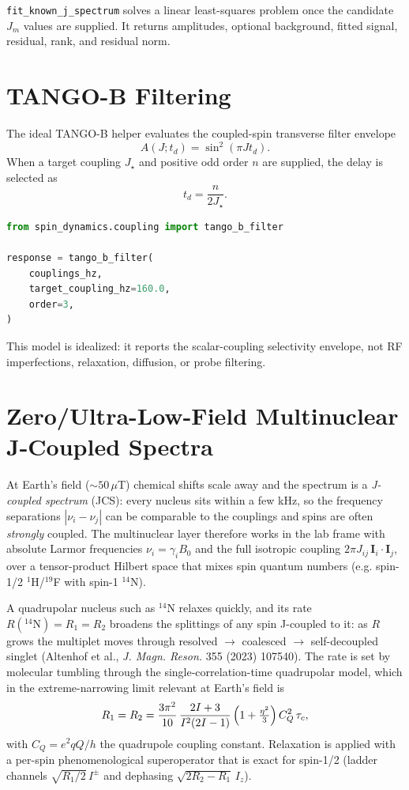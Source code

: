 \documentclass[11pt,oneside]{report}
\newcommand{\code}[1]{\texttt{#1}}
\begin{document}
\code{fit\_known\_j\_spectrum} solves a linear least-squares problem once the
candidate \(J_m\) values are supplied. It returns amplitudes, optional
background, fitted signal, residual, rank, and residual norm.

\section{TANGO-B Filtering}

The ideal TANGO-B helper evaluates the coupled-spin transverse filter envelope
\[
  A(J;t_d) = \sin^2\!\left(\pi J t_d\right).
\]
When a target coupling \(J_\star\) and positive odd order \(n\) are supplied,
the delay is selected as
\[
  t_d = \frac{n}{2J_\star}.
\]

\begin{lstlisting}[language=Python]
from spin_dynamics.coupling import tango_b_filter

response = tango_b_filter(
    couplings_hz,
    target_coupling_hz=160.0,
    order=3,
)
\end{lstlisting}

This model is idealized: it reports the scalar-coupling selectivity envelope,
not RF imperfections, relaxation, diffusion, or probe filtering.

\section{Zero/Ultra-Low-Field Multinuclear J-Coupled Spectra}
\label{sec:zulf-multinuclear}

At Earth's field (\(\sim 50\,\mu\)T) chemical shifts scale away and the spectrum
is a \emph{J-coupled spectrum} (JCS): every nucleus sits within a few kHz, so the
frequency separations \(|\nu_i-\nu_j|\) can be comparable to the couplings and
spins are often \emph{strongly} coupled. The multinuclear layer therefore works
in the lab frame with absolute Larmor frequencies \(\nu_i=\gamma_i B_0\) and the
full isotropic coupling \(2\pi J_{ij}\,\mathbf{I}_i\!\cdot\!\mathbf{I}_j\), over a
tensor-product Hilbert space that mixes spin quantum numbers (e.g. spin-1/2
\(^{1}\)H/\(^{19}\)F with spin-1 \(^{14}\)N).

A quadrupolar nucleus such as \(^{14}\)N relaxes quickly, and its rate
\(R(^{14}\mathrm{N})=R_1=R_2\) broadens the splittings of any spin J-coupled to
it: as \(R\) grows the multiplet moves through resolved
\(\rightarrow\) coalesced \(\rightarrow\) self-decoupled singlet (Altenhof et
al., \emph{J. Magn. Reson.} 355 (2023) 107540). The rate is set by molecular
tumbling through the single-correlation-time quadrupolar model, which in the
extreme-narrowing limit relevant at Earth's field is
\[
  R_1 = R_2 = \frac{3\pi^2}{10}\,
    \frac{2I+3}{I^2(2I-1)}\,
    \Bigl(1+\tfrac{\eta^2}{3}\Bigr)\,C_Q^2\,\tau_c ,
\]
with \(C_Q=e^2qQ/h\) the quadrupole coupling constant. Relaxation is applied with
a per-spin phenomenological superoperator that is exact for spin-1/2 (ladder
channels \(\sqrt{R_1/2}\,I^{\pm}\) and dephasing \(\sqrt{2R_2-R_1}\,I_z\)).
\end{document}
